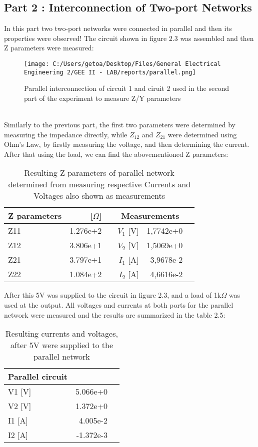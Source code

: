 \documentclass[12pt]{report}
\begin{document}
\subsection {Part 2 : Interconnection of Two-port Networks } 
In this part two two-port networks were connected in parallel and then its properties were observed! The circuit shown in figure 2.3 was assembled and then Z parameters were measured:\\
\begin{figure}[ht!]
  \centering
  \texttt{[image: C:/Users/getoa/Desktop/Files/General Electrical Engineering 2/GEE II - LAB/reports/parallel.png]}
  \caption{Parallel interconnection of circuit 1 and ciruit 2 used in the second part of the experiment to measure Z/Y parameters}
\end{figure} \\
Similarly to the previous part, the first two parameters were determined by measuring the impedance directly, while $Z_12$ and $Z_21$ were determined using Ohm's Law, by firstly measuring the voltage, and then determining the current. After that using the load, we can find the abovementioned Z parameters:
\begin{table}[!htp]\centering
\large
\begin{tabular}{lrrrrr}\toprule
Z parameters & [$\Omega$] & &\multicolumn{2}{c}{Measurements } \\\midrule
Z11 &1.276e+2  & &$V_1$ [V] &1,7742e+0\\
Z12 &3.806e+1  & &$V_2$ [V] & 1,5069e+0 \\
Z21 &3.797e+1  & &$I_1$ [A] &3,9678e-2 \\
Z22 &1.084e+2  & &$I_2$ [A] &4,6616e-2 \\
\bottomrule
\end{tabular}
\caption{Resulting Z parameters of parallel network determined from measuring respective Currents and Voltages also shown as measurements}
\label{tab: }
\end{table}
\newpage
 After this 5V was supplied to the circuit in figure 2.3, and a load of 1k$\Omega$ was used at the output. All voltages and currents at both ports for the parallel network were measured and the results are summarized in the table 2.5:
\begin{table}[!htp]\centering
\large
\begin{tabular}{lrr}\toprule
Parallel circuit  & \\\midrule
V1 [V] &5.066e+0 \\
V2 [V] &1.372e+0 \\
I1 [A] &4.005e-2 \\
I2 [A] &-1.372e-3 \\
\bottomrule
\end{tabular}
\caption{Resulting currents and voltages, after 5V were supplied to the parallel network}
\label{tab: }
\end{table}\\
\end{document}
